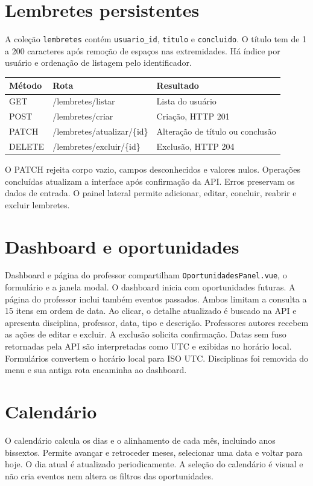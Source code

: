 \documentclass[11pt,a4paper]{article}
\begin{document}
\section{Lembretes persistentes}
A coleção \texttt{lembretes} contém \texttt{usuario\_id}, \texttt{titulo} e \texttt{concluido}.
O título tem de 1 a 200 caracteres após remoção de espaços nas extremidades.
Há índice por usuário e ordenação de listagem pelo identificador.
\begin{longtable}{p{2cm}p{7cm}p{5cm}}
Método & Rota & Resultado \\ \hline
GET & /lembretes/listar & Lista do usuário \\
POST & /lembretes/criar & Criação, HTTP 201 \\
PATCH & /lembretes/atualizar/\{id\} & Alteração de título ou conclusão \\
DELETE & /lembretes/excluir/\{id\} & Exclusão, HTTP 204 \\
\end{longtable}
O PATCH rejeita corpo vazio, campos desconhecidos e valores nulos. Operações concluídas atualizam a interface após confirmação da API. Erros preservam os dados de entrada.
O painel lateral permite adicionar, editar, concluir, reabrir e excluir lembretes.

\section{Dashboard e oportunidades}
Dashboard e página do professor compartilham \texttt{OportunidadesPanel.vue}, o formulário e a janela modal.
O dashboard inicia com oportunidades futuras. A página do professor inclui também eventos passados.
Ambos limitam a consulta a 15 itens em ordem de data. Ao clicar, o detalhe atualizado é buscado na API e apresenta disciplina, professor, data, tipo e descrição.
Professores autores recebem as ações de editar e excluir. A exclusão solicita confirmação.
Datas sem fuso retornadas pela API são interpretadas como UTC e exibidas no horário local. Formulários convertem o horário local para ISO UTC.
Disciplinas foi removida do menu e sua antiga rota encaminha ao dashboard.

\section{Calendário}
O calendário calcula os dias e o alinhamento de cada mês, incluindo anos bissextos. Permite avançar e retroceder meses, selecionar uma data e voltar para hoje. O dia atual é atualizado periodicamente.
A seleção do calendário é visual e não cria eventos nem altera os filtros das oportunidades.
\end{document}
